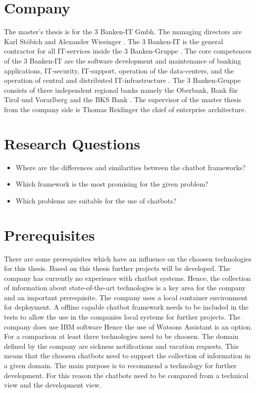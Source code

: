 \section{Company}
The master's thesis is for the 3 Banken-IT Gmbh. The managing directors are Karl St\"obich and Alexander Wiesinger \cite{3bitorgani}. 
The 3 Banken-IT is the general contractor for all IT-services inside the 3 Banken-Gruppe \cite{3bitservices}. 
The core competences of the 3 Banken-IT are the software development and maintenance of banking applications, IT-security, 
IT-support, operation of the data-centers, and the operation of central and distributed IT-infrastructure \cite{3bitservices}. 
The 3 Banken-Gruppe consists of three independent regional banks namely the Oberbank, Bank für Tirol und Vorarlberg and the BKS Bank \cite{3bitcompany}. 
The supervisor of the master thesis from the company side is Thomas Reidinger the chief of enterprise architecture.

\section{Research Questions}
\begin{itemize}
    \item Where are the differences and similarities between the chatbot frameworks?
    \item Which framework is the most promising for the given problem?
    \item Which problems are suitable for the use of chatbots?
\end{itemize}

\section{Prerequisites} \label{sec:prereq}
There are some prerequisites which have an influence on the choosen technologies for this thesis.
Based on this thesis further projects will be developed.
The company has currently no experience with chatbot systems.
Hence, the collection of information about state-of-the-art technologies
is a key area for the company and an important prerequisite.
The company uses a local container environment for deployment.
A offline capable chatbot framework needs to be included in the tests to 
allow the use in the companies local systems for further projects.
The company does use IBM software Hence the use of Watsons Assistant 
is an option.
For a comparison at least three technologies need to be choosen.
The domain defined by the company are sickness notifications and 
vacation requests.
This means that the choosen chatbots need to support the collection of 
information in a given domain.
The main purpose is to recommend a technology for further development.
For this reason the chatbots need to be compared from a technical view and 
the development view.


